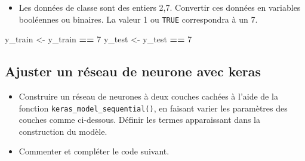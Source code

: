 \documentclass[]{article}
\newenvironment{Shaded}{\begin{snugshade}}{\end{snugshade}}
\newcommand{\KeywordTok}[1]{\textcolor[rgb]{0.13,0.29,0.53}{\textbf{#1}}}
\newcommand{\DataTypeTok}[1]{\textcolor[rgb]{0.13,0.29,0.53}{#1}}
\newcommand{\DecValTok}[1]{\textcolor[rgb]{0.00,0.00,0.81}{#1}}
\newcommand{\StringTok}[1]{\textcolor[rgb]{0.31,0.60,0.02}{#1}}
\newcommand{\CommentTok}[1]{\textcolor[rgb]{0.56,0.35,0.01}{\textit{#1}}}
\newcommand{\OperatorTok}[1]{\textcolor[rgb]{0.81,0.36,0.00}{\textbf{#1}}}
\newcommand{\NormalTok}[1]{#1}
\providecommand{\tightlist}{%
  \setlength{\itemsep}{0pt}\setlength{\parskip}{0pt}}
\begin{document}
\begin{Shaded}
\end{Shaded}

\begin{itemize}
\tightlist
\item
  Les données de classe sont des entiers 2,7. Convertir ces données en
  variables booléennes ou binaires. La valeur 1 ou \texttt{TRUE}
  correspondra à un 7.
\end{itemize}

\begin{Shaded}
\begin{Highlighting}[]
\NormalTok{  y_train <-}\StringTok{ }\NormalTok{y_train }\OperatorTok{==}\StringTok{ }\DecValTok{7}
\NormalTok{  y_test <-}\StringTok{  }\NormalTok{y_test }\OperatorTok{==}\StringTok{ }\DecValTok{7}
\end{Highlighting}
\end{Shaded}

\subsection{Ajuster un réseau de neurone avec
keras}\label{ajuster-un-reseau-de-neurone-avec-keras}

\begin{itemize}
\item
  Construire un réseau de neurones à deux couches cachées à l'aide de la
  fonction \texttt{keras\_model\_sequential()}, en faisant varier les
  paramètres des couches comme ci-dessous. Définir les termes
  apparaissant dans la construction du modèle.
\item
  Commenter et compléter le code suivant.
\end{itemize}
\end{document}
